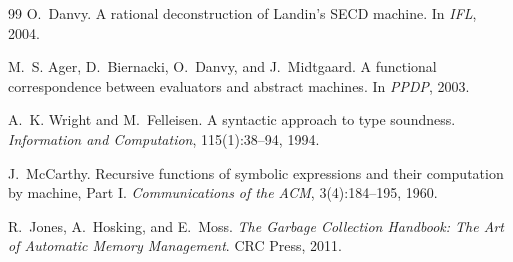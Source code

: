 \documentclass[11pt]{article}
\begin{document}
\begin{thebibliography}{99}
O.~Danvy.
\newblock A rational deconstruction of Landin's SECD machine.
\newblock In \emph{IFL}, 2004.

M.~S. Ager, D.~Biernacki, O.~Danvy, and J.~Midtgaard.
\newblock A functional correspondence between evaluators and abstract machines.
\newblock In \emph{PPDP}, 2003.

A.~K. Wright and M.~Felleisen.
\newblock A syntactic approach to type soundness.
\newblock \emph{Information and Computation}, 115(1):38--94, 1994.

J.~McCarthy.
\newblock Recursive functions of symbolic expressions and their computation by machine, Part I.
\newblock \emph{Communications of the ACM}, 3(4):184--195, 1960.

R.~Jones, A.~Hosking, and E.~Moss.
\newblock \emph{The Garbage Collection Handbook: The Art of Automatic Memory Management}.
\newblock CRC Press, 2011.

\end{thebibliography}
\end{document}
